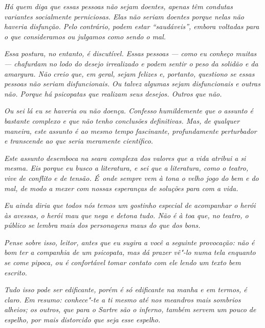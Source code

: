 \emph{Há quem diga que essas pessoas não sejam doentes, apenas têm
condutas variantes socialmente perniciosas. Elas não seriam doentes
porque nelas não haveria disfunção. Pelo contrário, podem estar
``saudáveis'', embora voltadas para o que consideramos ou julgamos como
sendo o mal.}~

\emph{Essa postura, no entanto, é discutível. Essas pessoas --- como eu
conheço muitas --- chafurdam no lodo do desejo irrealizado e podem
sentir o peso da solidão e da amargura. Não creio que, em geral, sejam
felizes e, portanto, questiono se essas pessoas não seriam
disfuncionais. Ou talvez algumas sejam disfuncionais e outras não.
Porque há psicopatas que realizam seus desejos. Outros que não.}~

\emph{Ou sei lá eu se haveria ou não doença. Confesso humildemente que o
assunto é bastante complexo e que não tenho conclusões definitivas. Mas,
de qualquer maneira, este assunto é ao mesmo tempo fascinante,
profundamente perturbador e transcende ao que seria meramente
científico.}~

\emph{Este assunto desemboca na seara complexa dos valores que a vida
atribui a si mesma. Eis porque eu busco a literatura, e sei que a
literatura, como o teatro, vive de conflito e de tensão. É~onde sempre
vem à tona o velho jogo do bem e do mal, de modo a mexer com nossas
esperanças de soluções para com a vida.}~

\emph{Eu ainda diria que todos nós temos um gostinho especial de
acompanhar o herói às avessas, o herói mau que nega e detona tudo. Não é
à toa que, no teatro, o público se lembra mais dos personagens maus do
que dos bons.}~

\emph{Pense sobre isso, leitor, antes que eu sugira a você a seguinte
provocação: não é bom ter a companhia de um psicopata, mas dá prazer
vê"-lo numa tela enquanto se come pipoca, ou é confortável tomar contato
com ele lendo um texto bem escrito.}~

\emph{Tudo isso pode ser edificante, porém é só edificante na manha e em
termos, é claro. Em resumo: conhece"-te a ti mesmo até nos meandros mais
sombrios alheios; os outros, que para o Sartre são o inferno, também
servem um pouco de espelho, por mais distorcido que seja esse espelho.~}
\endgroup